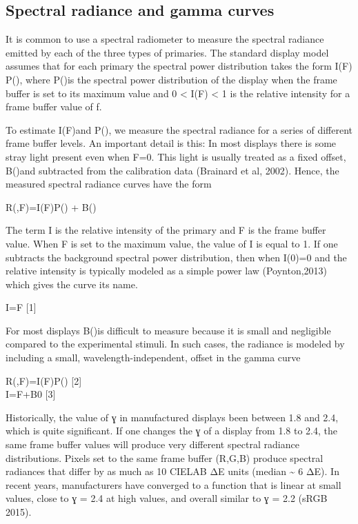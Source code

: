 \documentclass[
  letterpaper,
]{book}
\begin{document}
\subsection{\texorpdfstring{\textbf{Spectral radiance and gamma
curves}}{Spectral radiance and gamma curves}}\label{spectral-radiance-and-gamma-curves}

It is common to use a spectral radiometer to measure the spectral
radiance emitted by each of the three types of primaries. The standard
display model assumes that for each primary the spectral power
distribution takes the form I(F) P(), where P()is the spectral power
distribution of the display when the frame buffer is set to its maximum
value and 0 \textless{} I(F) \textless{} 1 is the relative intensity for
a frame buffer value of f.

To estimate I(F)and P(), we measure the spectral radiance for a series
of different frame buffer levels. An important detail is this: In most
displays there is some stray light present even when F=0. This light is
usually treated as a fixed offset, B()and subtracted from the
calibration data (Brainard et al, 2002). Hence, the measured spectral
radiance curves have the form

R(,F)=I(F)P() + B()

The term I is the relative intensity of the primary and F is the frame
buffer value. When F is set to the maximum value, the value of I is
equal to 1. If one subtracts the background spectral power distribution,
then when I(0)=0 and the relative intensity is typically modeled as a
simple power law (Poynton,2013) which gives the curve its name.

I=F {[}1{]}

For most displays B()is difficult to measure because it is small and
negligible compared to the experimental stimuli. In such cases, the
radiance is modeled by including a small, wavelength-independent, offset
in the gamma curve

R(,F)=I(F)P() {[}2{]}\\
I=F+B0 {[}3{]}

Historically, the value of ɣ in manufactured displays been between 1.8
and 2.4, which is quite significant. If one changes the ɣ of a display
from 1.8 to 2.4, the same frame buffer values will produce very
different spectral radiance distributions. Pixels set to the same frame
buffer (R,G,B) produce spectral radiances that differ by as much as 10
CIELAB ΔE units (median \textasciitilde{} 6 ΔE). In recent years,
manufacturers have converged to a function that is linear at small
values, close to ɣ = 2.4 at high values, and overall similar to ɣ = 2.2
(sRGB 2015).
\end{document}
